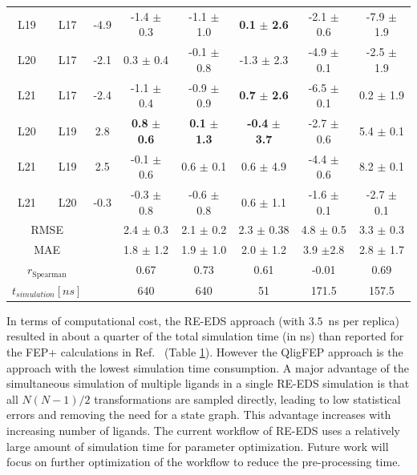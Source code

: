\begin{table}[h]
\begin{center}
\begin{adjustbox}{max width=\textwidth}
\begin{tabular}{ c c |c |c|c|c|c|c}
        L19 &  L17 & -4.9 & -1.4 $\pm$ 0.3          & -1.1 $\pm$ 1.0         & \textbf{0.1} $\pm$ \textbf{2.6}                    &   -2.1 $\pm$ 0.6 & -7.9 $\pm$ 1.9\\
        L20 &  L17 & -2.1 &  0.3 $\pm$ 0.4          & -0.1 $\pm$ 0.8         & -1.3 $\pm$ 2.3                                     &   -4.9 $\pm$ 0.1 & -2.5 $\pm$ 1.9\\
        L21 &  L17 & -2.4 & -1.1 $\pm$ 0.4          & -0.9 $\pm$ 0.9         &\textbf{0.7} $\pm$ \textbf{2.6}                     &  -6.5 $\pm$ 0.1 &  0.2 $\pm$ 1.9\\
        L20 &  L19 & 2.8  &\textbf{0.8} $\pm$ \textbf{0.6}   & \textbf{0.1} $\pm$ \textbf{1.3} & \textbf{-0.4} $\pm$ \textbf{3.7} &  -2.7 $\pm$ 0.6 &  5.4 $\pm$ 0.1\\
        L21 &  L19 & 2.5  & -0.1 $\pm$ 0.6         &  0.6 $\pm$ 0.1         &  0.6 $\pm$ 4.9                                      &  -4.4 $\pm$ 0.6 &  8.2 $\pm$ 0.1\\
        L21 &  L20 & -0.3 & -0.3 $\pm$ 0.8         & -0.6 $\pm$ 0.8         &  0.6 $\pm$ 1.1                                    &    -1.6 $\pm$ 0.1 &   -2.7 $\pm$ 0.1\\ 
    \hline
        \multicolumn{2}{c|}{RMSE} &                    & 2.4  $\pm$ 0.3           & 2.1  $\pm$ 0.2          &  2.3  $\pm$ 0.38      & 4.8 $\pm$ 0.5         & 3.3  $\pm$ 0.3 \\
        \multicolumn{2}{c|}{MAE} &                     & 1.8 $\pm$ 1.2 & 1.9 $\pm$ 1.0 & 2.0 $\pm$ 1.2 & 3.9 $\pm$2.8 & 2.8 $\pm$ 1.7 \\
        \multicolumn{2}{c|}{$r_{\text{Spearman}}$} & & 0.67           & 0.73          & 0.61          & -0.01           & 0.69 \\
        \multicolumn{2}{c|}{$t_{simulation} [ns]$} & & 640          &  640         &  51        & 171.5         & 157.5  \\
\end{tabular}
\end{adjustbox}
\end{center}
\label{tab: RE-EDS_FE_RingCycleOpening_ddF}
\end{table}

In terms of computational cost, the RE-EDS approach (with $3.5$~ns per replica) resulted in about a quarter of the total simulation time (in ns) than reported for the FEP+ calculations in Ref.~\cite{Wang2017} (Table \ref{tab: RE-EDS_FE_RingCycleOpening_ddF}). However the QligFEP approach is the approach with the lowest simulation time consumption. A major advantage of the simultaneous simulation of multiple ligands in a single RE-EDS simulation is that all $N(N-1)/2$ transformations are sampled directly, leading to low statistical errors and removing the need for a state graph. This advantage increases with increasing number of ligands. The current workflow of RE-EDS uses a relatively large amount of simulation time for parameter optimization. Future work will focus on further optimization of the workflow to reduce the pre-processing time. 

